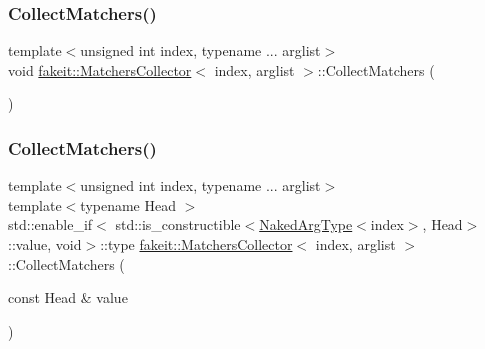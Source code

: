 \subsubsection{\texorpdfstring{CollectMatchers()}{CollectMatchers()}\hspace{0.1cm}{\footnotesize\ttfamily [24/63]}}
{\footnotesize\ttfamily template$<$unsigned int index, typename ... arglist$>$ \\
void \mbox{\hyperlink{classfakeit_1_1MatchersCollector}{fakeit\+::\+Matchers\+Collector}}$<$ index, arglist $>$\+::Collect\+Matchers (\begin{DoxyParamCaption}{ }\end{DoxyParamCaption})\hspace{0.3cm}{\ttfamily [inline]}}

\mbox{\label{classfakeit_1_1MatchersCollector_affd243a89f758239d77c70dce6318087}} 
\subsubsection{\texorpdfstring{CollectMatchers()}{CollectMatchers()}\hspace{0.1cm}{\footnotesize\ttfamily [25/63]}}
{\footnotesize\ttfamily template$<$unsigned int index, typename ... arglist$>$ \\
template$<$typename Head $>$ \\
std\+::enable\+\_\+if$<$ std\+::is\+\_\+constructible$<$\mbox{\hyperlink{classfakeit_1_1MatchersCollector_aeda8ced6a2f0cb7c6e4f916f18a91730}{Naked\+Arg\+Type}}$<$index$>$, Head$>$\+::value, void$>$\+::type \mbox{\hyperlink{classfakeit_1_1MatchersCollector}{fakeit\+::\+Matchers\+Collector}}$<$ index, arglist $>$\+::Collect\+Matchers (\begin{DoxyParamCaption}\item[{const Head \&}]{value }\end{DoxyParamCaption})\hspace{0.3cm}{\ttfamily [inline]}}

\mbox{\label{classfakeit_1_1MatchersCollector_a29c5245d03b8fab3773455c087edde74}} 
